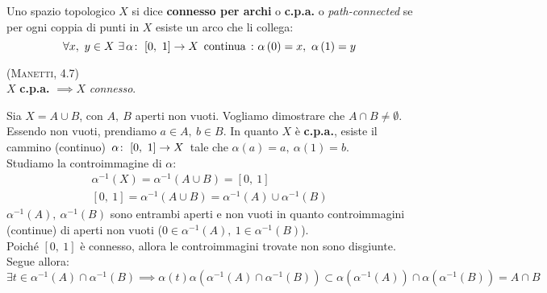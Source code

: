 \begin{define}
	Uno spazio topologico $X$ si dice \textbf{connesso per archi} o \textbf{c.p.a.} o \textit{path-connected} se per ogni coppia di punti in $X$ esiste un arco che li collega:
	\begin{equation}
		\forall x,\ y\in X\ \exists \funz{\alpha}{\left[0,\ 1\right]}{X} \text{ continua}\ \colon \alpha\left(0\right)=x,\ \alpha\left(1\right)=y
	\end{equation}
\end{define}
\begin{theorema}\textsc{(Manetti, 4.7)}\\
	$X$ \textbf{c.p.a.} $\implies X$ \textit{connesso}.
\end{theorema}
\begin{demonstration}
	Sia $X=A\cup B$, con $A,\ B$ aperti non vuoti. Vogliamo dimostrare che $A\cap B\neq \emptyset$. Essendo non vuoti, prendiamo $a\in A,\ b\in B$. In quanto $X$ è \textbf{c.p.a.}, esiste il cammino (continuo) $\funz{\alpha}{\left[0,\ 1\right]}{X}$ tale che $\alpha\left(a\right)=a,\ \alpha\left(1\right)=b$.\\
	Studiamo la controimmagine di $\alpha$:
	\begin{gather*}
		\alpha^{-1}\left(X\right)=\alpha^{-1}\left(A\cup B\right)=\left[0,\ 1\right]\\
		\left[0,\ 1\right]=\alpha^{-1}\left(A\cup B\right)=\alpha^{-1}\left(A\right)\cup \alpha^{-1}\left(B\right)
	\end{gather*}
	$\alpha^{-1}\left(A\right),\ \alpha^{-1}\left(B\right)$ sono entrambi aperti e non vuoti in quanto controimmagini (continue) di aperti non vuoti ($0\in \alpha^{-1}\left(A\right),\ 1\in \alpha^{-1}\left(B\right)$).\\
	Poiché $\left[0,\ 1\right]$ è connesso, allora le controimmagini trovate non sono disgiunte. Segue allora:
	\begin{equation*}
		\exists t\in \alpha^{-1}\left(A\right)\cap \alpha^{-1}\left(B\right)\implies \alpha\left(t\right)\alpha\left(\alpha^{-1}\left(A\right)\cap \alpha^{-1}\left(B\right)\right)\subset\alpha\left(\alpha^{-1}\left(A\right)\right)\cap\alpha\left(\alpha^{-1}\left(B\right)\right)=A\cap B
	\end{equation*}
\end{demonstration}
